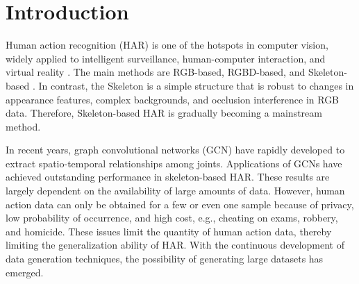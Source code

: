 \section{Introduction}
\label{sec:intro}

Human action recognition (HAR) is one of the hotspots in computer vision, widely applied to intelligent surveillance, human-computer interaction, and virtual reality \cite{aggarwal2014human,escalera2017challenges,han2017space,wang2018rgb}.
The main methods are RGB-based, RGBD-based, and Skeleton-based \cite{ji20123d,feichtenhofer2016convolutional,feichtenhofer2019slowfast,carreira2017quo,yang2019asymmetric,li2019actional}. 
In contrast, the Skeleton is a simple structure that is robust to changes in appearance features, complex backgrounds, and occlusion interference in RGB data. Therefore, Skeleton-based HAR is gradually becoming a mainstream method.

In recent years, graph convolutional networks (GCN) \cite{yan2018spatial,shi2019two,bai2022skeleton,cai2021jolo} have rapidly developed to extract spatio-temporal relationships among joints.
Applications of GCNs have achieved outstanding performance in skeleton-based HAR.
These results are largely dependent on the availability of large amounts of data.
However, human action data can only be obtained for a few or even one sample because of privacy, low probability of occurrence, and high cost, e.g., cheating on exams, robbery, and homicide.
These issues limit the quantity of human action data, thereby limiting the generalization ability of HAR. With the continuous development of data generation techniques, the possibility of generating large datasets has emerged. 

